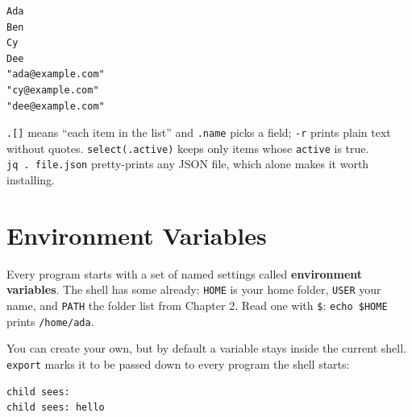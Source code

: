 \begin{codeblock}
\begin{Verbatim}[formatcom=\outputstyle]
Ada
Ben
Cy
Dee
"ada@example.com"
"cy@example.com"
"dee@example.com"
\end{Verbatim}
\end{codeblock}

\texttt{.{[}{]}} means ``each item in the list'' and \texttt{.name} picks a field; \texttt{-r} prints plain text without quotes. \texttt{select(.active)} keeps only items whose \texttt{active} is true. \texttt{jq\ .\ file.json} pretty-prints any JSON file, which alone makes it worth installing.

\section{Environment Variables}\label{05-the-everyday-command-line:environment-variables}

Every program starts with a set of named settings called \textbf{environment variables}. The shell has some already: \texttt{HOME} is your home folder, \texttt{USER} your name, and \texttt{PATH} the folder list from Chapter 2. Read one with \texttt{\$}: \texttt{echo\ \$HOME} prints \texttt{/home/ada}.


You can create your own, but by default a variable stays inside the current shell. \texttt{export} marks it to be passed down to every program the shell starts:

\begin{codeblock}

\begin{Shaded}
\begin{Highlighting}[]
\OperatorTok{=}
  
 
  
\end{Highlighting}
\end{Shaded}

\end{codeblock}

\begin{codeblock}
\begin{Verbatim}[formatcom=\outputstyle]
child sees: 
child sees: hello
\end{Verbatim}
\end{codeblock}

